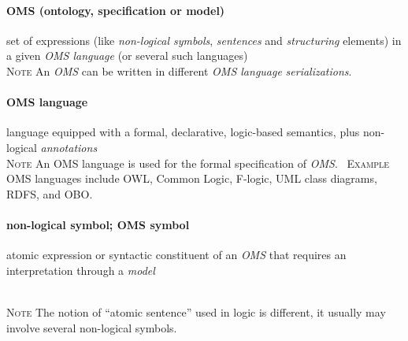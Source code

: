 \documentclass[10pt,%
\ifpretendfinal
final%
\else
draft%
\fi,
]{scrreprt}
\newcommand*{\termref}[1]{\textit{#1}}
\newcommand*{\synonym}{; }
\newcommand{\termdefinition}[2]{\paragraph{#1} #2}
\newenvironment{definitions}[0]{\medskip }{}
\newenvironment{note}[0]{\ \\ \textsc{Note} \quad}{}
\newenvironment{example}[0]{\ \newline \textsc{Example}\quad }{}
\begin{document}
\begin{definitions}

  \termdefinition{OMS (ontology, specification or model)}{set of expressions (like \termref{non-logical symbols}, \termref{sentences} and \termref{structuring} elements) in a given \termref{OMS language} (or several such languages)}%
\begin{note}
	An \termref{OMS} can be written in different \termref{OMS language} \termref{serializations}.
\end{note}	

  \termdefinition{OMS language}{language equipped with a formal, declarative, logic-based semantics, plus non-logical \termref{annotations}}
  \begin{note}
  An OMS language is used for the formal specification of \termref{OMS}.
  \end{note}
  \begin{example}
    OMS languages include OWL, Common Logic, F-logic, UML class diagrams, RDFS, and OBO.
  \end{example}


  \termdefinition{non-logical symbol\synonym OMS symbol}{atomic expression or syntactic constituent of an \termref{OMS} that requires an interpretation through a \termref{model}}

  \begin{note}
  The notion of ``atomic sentence'' used in logic is different, it usually
  may involve several non-logical symbols.
  \end{note}


\end{definitions}
\end{document}
